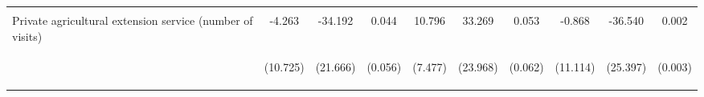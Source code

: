 \begin{center}
\begin{tabular}{lccccccccc}
\vspace{4pt} & \begin{footnotesize}[0.952]\end{footnotesize} & \begin{footnotesize}[0.001]\end{footnotesize} & \begin{footnotesize}[0.863]\end{footnotesize} & \begin{footnotesize}[0.902]\end{footnotesize} & \begin{footnotesize}[0.728]\end{footnotesize} & \begin{footnotesize}[0.867]\end{footnotesize} & \begin{footnotesize}[0.971]\end{footnotesize} & \begin{footnotesize}[0.000]\end{footnotesize} & \begin{footnotesize}[0.458]\end{footnotesize} \\
Private agricultural extension service (number of visits) & -4.263 & -34.192 & 0.044 & 10.796 & 33.269 & 0.053 & -0.868 & -36.540 & 0.002 \\
 & \begin{footnotesize}(10.725)\end{footnotesize} & \begin{footnotesize}(21.666)\end{footnotesize} & \begin{footnotesize}(0.056)\end{footnotesize} & \begin{footnotesize}(7.477)\end{footnotesize} & \begin{footnotesize}(23.968)\end{footnotesize} & \begin{footnotesize}(0.062)\end{footnotesize} & \begin{footnotesize}(11.114)\end{footnotesize} & \begin{footnotesize}(25.397)\end{footnotesize} & \begin{footnotesize}(0.003)\end{footnotesize} \\

\end{tabular}
\end{center}
